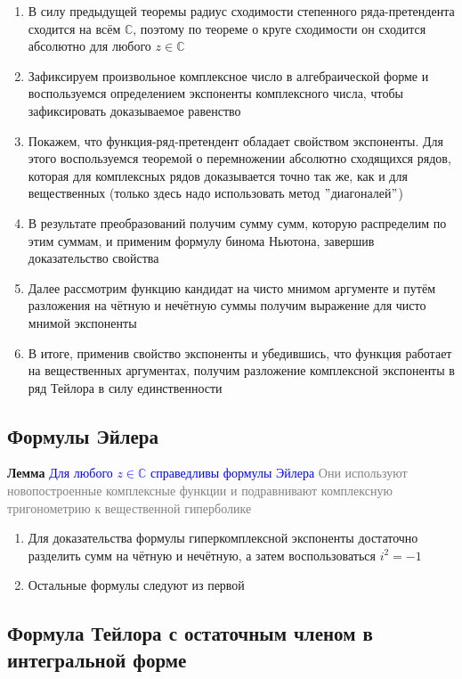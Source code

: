 \begin{enumerate}
    \item В силу предыдущей теоремы радиус сходимости степенного ряда-претендента сходится на всём $\mathbb{C}$,
    поэтому по теореме о круге сходимости он сходится абсолютно для любого $z \in \mathbb{C}$
    \item Зафиксируем произвольное комплексное число в алгебраической форме и воспользуемся определением
    экспоненты комплексного числа, чтобы зафиксировать доказываемое равенство
    \item Покажем, что функция-ряд-претендент обладает свойством экспоненты.
    Для этого воспользуемся теоремой о перемножении абсолютно сходящихся рядов, которая для комплексных рядов
    доказывается точно так же, как и для вещественных (только здесь надо использовать метод \("\)диагоналей\("\))
    \item В результате преобразований получим сумму сумм, которую распределим по этим суммам, и применим формулу
    бинома Ньютона, завершив доказательство свойства
    \item Далее рассмотрим функцию кандидат на чисто мнимом аргументе и путём разложения на чётную и нечётную
    суммы получим выражение для чисто мнимой экспоненты
    \item В итоге, применив свойство экспоненты и убедившись, что функция работает на вещественных аргументах,
    получим разложение комплексной экспоненты в ряд Тейлора в силу единственности
\end{enumerate}

\subsection{Формулы Эйлера}

\textbf{Лемма} \textcolor{blue}{Для любого $z \in \mathbb{C}$ справедливы формулы Эйлера} \textcolor{gray}{Они
используют новопостроенные комплексные функции и подравнивают комплексную тригонометрию к вещественной гиперболике}

\begin{enumerate}
    \item Для доказательства формулы гиперкомплексной экспоненты достаточно разделить сумм на чётную и нечётную,
    а затем воспользоваться $i^2 = -1$
    \item Остальные формулы следуют из первой
\end{enumerate}

\subsection{Формула Тейлора с остаточным членом в интегральной форме}

